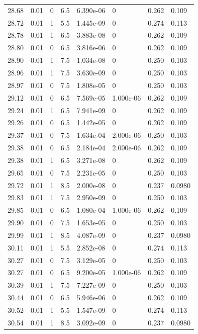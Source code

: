 \documentclass[preview]{standalone}
\begin{document}
{{{{{{{{{\begin{tabular}{L{1.2cm}C{1.2cm} C{0.3cm}C{0.5cm} C{1.4cm}C{1.4cm} C{1.4cm}C{1.4cm}}
  28.68  &  0.01  & 0     & 6.5 &  6.390e-06  & 0  & 0.262 &  0.109   \\ 
  28.72  &  0.01  & 1     & 5.5 &  1.445e-09  & 0  & 0.274 &  0.113   \\ 
  28.78  &  0.01  & 1     & 6.5 &  3.883e-08  & 0  & 0.262 &  0.109   \\ 
  28.80  &  0.01  & 0     & 6.5 &  3.816e-06  & 0  & 0.262 &  0.109   \\ 
  28.90  &  0.01  & 1     & 7.5 &  1.034e-08  & 0  & 0.250 &  0.103   \\ 
  28.96  &  0.01  & 1     & 7.5 &  3.630e-09  & 0  & 0.250 &  0.103   \\ 
  28.97  &  0.01  & 0     & 7.5 &  1.808e-05  & 0  & 0.250 &  0.103   \\ 
  29.12  &  0.01  & 0     & 6.5 &  7.569e-05  & 1.000e-06  & 0.262 &  0.109   \\ 
  29.24  &  0.01  & 1     & 6.5 &  7.941e-09  & 0  & 0.262 &  0.109   \\ 
  29.26  &  0.01  & 0     & 6.5 &  1.442e-05  & 0  & 0.262 &  0.109   \\ 
  29.37  &  0.01  & 0     & 7.5 &  1.634e-04  & 2.000e-06  & 0.250 &  0.103   \\ 
  29.38  &  0.01  & 0     & 6.5 &  2.184e-04  & 2.000e-06  & 0.262 &  0.109   \\ 
  29.38  &  0.01  & 1     & 6.5 &  3.271e-08  & 0  & 0.262 &  0.109   \\ 
  29.65  &  0.01  & 0     & 7.5 &  2.231e-05  & 0  & 0.250 &  0.103   \\ 
  29.72  &  0.01  & 1     & 8.5 &  2.000e-08  & 0  & 0.237 &  0.0980   \\ 
  29.83  &  0.01  & 1     & 7.5 &  2.950e-09  & 0  & 0.250 &  0.103   \\ 
  29.85  &  0.01  & 0     & 6.5 &  1.080e-04  & 1.000e-06  & 0.262 &  0.109   \\ 
  29.90  &  0.01  & 0     & 7.5 &  1.653e-05  & 0  & 0.250 &  0.103   \\ 
  29.99  &  0.01  & 1     & 8.5 &  4.087e-09  & 0  & 0.237 &  0.0980   \\ 
  30.11  &  0.01  & 1     & 5.5 &  2.852e-08  & 0  & 0.274 &  0.113   \\ 
  30.27  &  0.01  & 0     & 7.5 &  3.129e-05  & 0  & 0.250 &  0.103   \\ 
  30.27  &  0.01  & 0     & 6.5 &  9.200e-05  & 1.000e-06  & 0.262 &  0.109   \\ 
  30.39  &  0.01  & 1     & 7.5 &  7.227e-09  & 0  & 0.250 &  0.103   \\ 
  30.44  &  0.01  & 0     & 6.5 &  5.946e-06  & 0  & 0.262 &  0.109   \\ 
  30.52  &  0.01  & 1     & 5.5 &  1.547e-09  & 0  & 0.274 &  0.113   \\ 
  30.54  &  0.01  & 1     & 8.5 &  3.092e-09  & 0  & 0.237 &  0.0980   \\ 
\hline 
\end{tabular} 

}}}}}}}}}
\end{document}
